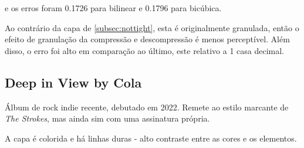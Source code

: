 \documentclass{article}
\begin{document}
e os erros foram 0.1726 para bilinear e 0.1796 para bicúbica.

Ao contrário da capa de \ref{subsec:nottight}, esta é originalmente
granulada, então o efeito de granulação da compressão e descompressão é
menos perceptível. Além disso, o erro foi alto em comparação ao último,
este relativo a 1 casa decimal.

\subsection{Deep in View by Cola}

Álbum de rock indie recente, debutado em 2022. Remete ao estilo marcante
de \textit{The Strokes}, mas ainda sim com uma assinatura própria.

A capa é colorida e há linhas duras - alto contraste entre as cores e
os elementos.
\end{document}
